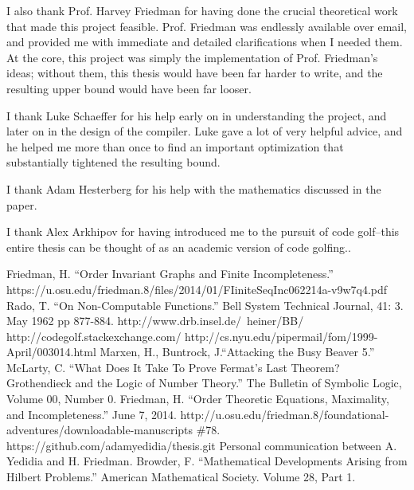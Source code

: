 \documentclass[11pt]{report}
\begin{document}
I also thank Prof. Harvey Friedman for having done the crucial theoretical work that made this project feasible. Prof. Friedman was endlessly available over email, and provided me with immediate and detailed clarifications when I needed them. At the core, this project was simply the implementation of Prof. Friedman's ideas; without them, this thesis would have been far harder to write, and the resulting upper bound would have been far looser.

I thank Luke Schaeffer for his help early on in understanding the project, and later on in the design of the compiler. Luke gave a lot of very helpful advice, and he helped me more than once to find an important optimization that substantially tightened the resulting bound.

I thank Adam Hesterberg for his help with the mathematics discussed in the paper.

I thank Alex Arkhipov for having introduced me to the pursuit of code golf--this entire thesis can be thought of as an academic version of code golfing..


\begin{thebibliography}{100}
 Friedman, H. ``Order Invariant Graphs and Finite Incompleteness.'' https://u.osu.edu/friedman.8/files/2014/01/FIiniteSeqInc062214a-v9w7q4.pdf
 Rado, T. ``On Non-Computable Functions.'' 
Bell System Technical Journal, 41: 3. May 1962 pp 877-884.
 http://www.drb.insel.de/~heiner/BB/
 http://codegolf.stackexchange.com/
 http://cs.nyu.edu/pipermail/fom/1999-April/003014.html
 Marxen, H., Buntrock, J.``Attacking the Busy Beaver 5.'' 
 McLarty, C. ``What Does It Take To Prove Fermat's Last Theorem? Grothendieck and the Logic of Number Theory.'' The Bulletin of Symbolic Logic, Volume 00, Number 0.
 Friedman, H. ``Order Theoretic Equations, Maximality, and Incompleteness.'' June 7, 2014. http://u.osu.edu/friedman.8/foundational-adventures/downloadable-manuscripts \#78.
 https://github.com/adamyedidia/thesis.git
 Personal communication between A. Yedidia and H. Friedman.
 Browder, F. ``Mathematical Developments Arising from Hilbert Problems.'' American Mathematical Society. Volume 28, Part 1.
\end{thebibliography}
\end{document}
